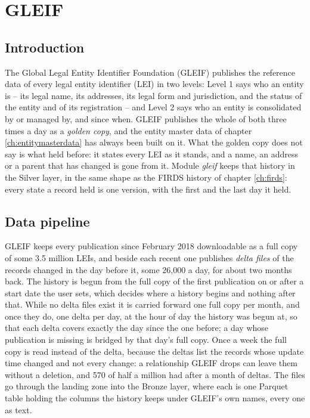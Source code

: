 \chapter{GLEIF}\label{ch:gleif}

\section{Introduction}

The Global Legal Entity Identifier Foundation (GLEIF) publishes the reference data of every legal entity identifier (LEI) in two levels: Level 1 says who an entity is -- its legal name, its addresses, its legal form and jurisdiction, and the status of the entity and of its registration -- and Level 2 says who an entity is consolidated by or managed by, and since when. GLEIF publishes the whole of both three times a day as a \emph{golden copy}, and the entity master data of chapter \ref{ch:entitymasterdata} has always been built on it. What the golden copy does not say is what held before: it states every LEI as it stands, and a name, an address or a parent that has changed is gone from it. Module \emph{gleif} keeps that history in the Silver layer, in the same shape as the FIRDS history of chapter \ref{ch:firds}: every state a record held is one version, with the first and the last day it held.

\section{Data pipeline}

GLEIF keeps every publication since February 2018 downloadable as a full copy of some 3.5 million LEIs, and beside each recent one publishes \emph{delta files} of the records changed in the day before it, some 26,000 a day, for about two months back. The history is begun from the full copy of the first publication on or after a start date the user sets, which decides where a history begins and nothing after that. While no delta files exist it is carried forward one full copy per month, and once they do, one delta per day, at the hour of day the history was begun at, so that each delta covers exactly the day since the one before; a day whose publication is missing is bridged by that day's full copy. Once a week the full copy is read instead of the delta, because the deltas list the records whose update time changed and not every change: a relationship GLEIF drops can leave them without a deletion, and 570 of half a million had after a month of deltas. The files go through the landing zone into the Bronze layer, where each is one Parquet table holding the columns the history keeps under GLEIF's own names, every one as text.

